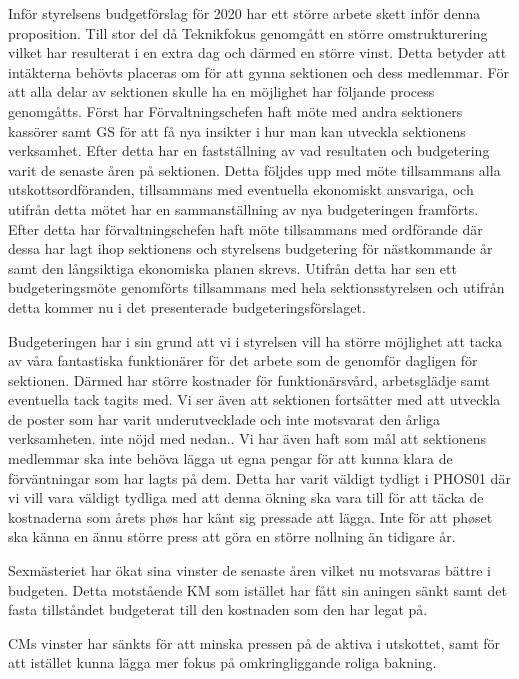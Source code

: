 \documentclass[../_main/handlingar.tex]{subfiles}
\begin{document}

Inför styrelsens budgetförslag för 2020 har ett större arbete skett inför denna proposition.
Till stor del då Teknikfokus genomgått en större omstrukturering vilket har resulterat i en extra dag och därmed en större vinst. Detta betyder att intäkterna behövts placeras om för att gynna sektionen och dess medlemmar.
För att alla delar av sektionen skulle ha en möjlighet har följande process genomgåtts. 
Först har Förvaltningschefen haft möte med andra sektioners kassörer samt GS för att få nya insikter i hur man kan utveckla sektionens verksamhet. 
Efter detta har en fastställning av vad resultaten och budgetering varit de senaste åren på sektionen. 
Detta följdes upp med möte tillsammans alla utskottsordföranden, tillsammans med eventuella ekonomiskt ansvariga, och utifrån detta mötet har en sammanställning av nya budgeteringen framförts. 
Efter detta har förvaltningschefen haft möte tillsammans med ordförande där dessa har lagt ihop sektionens och styrelsens budgetering för nästkommande år samt den långsiktiga ekonomiska planen skrevs. 
Utifrån detta har sen ett budgeteringsmöte genomförts tillsammans med hela sektionsstyrelsen och utifrån detta kommer nu i det presenterade budgeteringsförslaget.

Budgeteringen har i sin grund att vi i styrelsen vill ha större möjlighet att tacka av våra fantastiska funktionärer för det arbete som de genomför dagligen för sektionen. Därmed har större kostnader för funktionärsvård, arbetsglädje samt eventuella tack tagits med.
Vi ser även att sektionen fortsätter med att utveckla de poster som har varit underutvecklade och inte motsvarat den årliga verksamheten.
inte nöjd med nedan..
Vi har även haft som mål att sektionens medlemmar ska inte behöva lägga ut egna pengar för att kunna klara de förväntningar som har lagts på dem. Detta har varit väldigt tydligt i PHOS01 där vi vill vara väldigt tydliga med att denna ökning ska vara till för att täcka de kostnaderna som årets phøs har känt sig pressade att lägga. Inte för att phøset ska känna en ännu större press att göra en större nollning än tidigare år.

Sexmästeriet har ökat sina vinster de senaste åren vilket nu motsvaras bättre i budgeten. Detta motstående KM som istället har fått sin aningen sänkt samt det fasta tillståndet budgeterat till den kostnaden som den har legat på.

CMs vinster har sänkts för att minska pressen på de aktiva i utskottet, samt för att istället kunna lägga mer fokus på omkringliggande roliga bakning.
\end{document}
